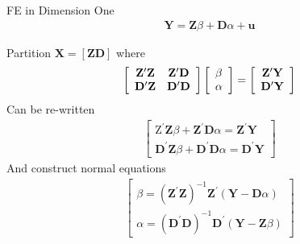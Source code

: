 \begin{frame}{FE in Dimension One}
\begin{align*}
\mathbf{Y} = \mathbf{Z} \beta + \mathbf{D} \alpha + \mathbf{u}
\end{align*}

Partition $\mathbf{X} = [\mathbf{Z} \mathbf{D}]$ where
\begin{align*}
\left[ \begin{array} { c c } { \mathbf { Z } ^ { \prime } \mathbf { Z } } & { \mathbf { Z } ^ { \prime } \mathbf { D } } \\ { \mathbf { D } ^ { \prime } \mathbf { Z } } & { \mathbf { D } ^ { \prime } \mathbf { D } } \end{array} \right] \left[ \begin{array} { l } { \beta } \\ { \alpha } \end{array} \right] = \left[ \begin{array} { c } { \mathbf { Z } ^ { \prime } \mathbf { Y } } \\ { \mathbf { D } ^ { \prime } \mathbf { Y } } \end{array} \right]\\
\end{align*}
Can be re-written
\begin{align*}
\left[ \begin{array} { c } { \mathrm { Z } ^ { \prime } \mathbf { Z } \beta + \mathbf { Z } ^ { \prime } \mathbf { D } \alpha = \mathbf { Z } ^ { \prime } \mathbf { Y } } \\ { \mathbf { D } ^ { \prime } \mathbf { Z } \beta + \mathbf { D } ^ { \prime } \mathbf { D } \alpha = \mathbf { D } ^ { \prime } \mathbf { Y } } \end{array} \right]
\end{align*}
And construct \alert{normal equations}
\begin{align*}
\left[ \begin{array} { c } { \beta = \left( \mathbf { Z } ^ { \prime } \mathbf { Z } \right) ^ { - 1 } \mathbf { Z } ^ { \prime } ( \mathbf { Y } - \mathbf { D } \alpha ) } \\ { \alpha = \left( \mathbf { D } ^ { \prime } \mathbf { D } \right) ^ { - 1 } \mathbf { D } ^ { \prime } ( \mathbf { Y } - \mathbf { Z } \beta ) } \end{array} \right]
\end{align*}
\end{frame}


